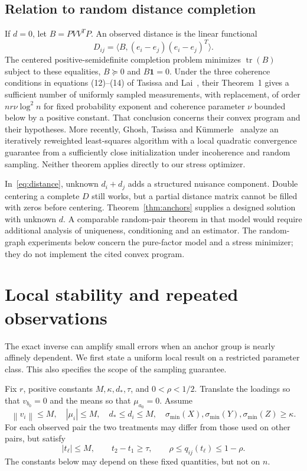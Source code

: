 \documentclass[11pt]{amsart}
\theoremstyle{definition}\newtheorem{example}[theorem]{Example}
\theoremstyle{remark}\newtheorem{remark}[theorem]{Remark}
\newcommand{\one}{\mathbf 1}\newcommand{\diag}{\operatorname{diag}}
\newcommand{\norm}[1]{\left\lVert#1\right\rVert}
\DeclareMathOperator{\tr}{tr}
\begin{document}
\subsection{Relation to random distance completion}
If $d=0$, let $B=PVV^TP$. An observed distance is the linear functional
\[
 D_{ij}=\langle B,(e_i-e_j)(e_i-e_j)^T\rangle.
\]
The centered positive-semidefinite completion problem minimizes $\tr(B)$ subject to these equalities, $B\succeq0$ and $B\one=0$. Under the three coherence conditions in equations (12)--(14) of Tasissa and Lai~\cite{tasissa2019}, their Theorem~1 gives a sufficient number of uniformly sampled measurements, with replacement, of order $nr\nu\log^2 n$ for fixed probability exponent and coherence parameter $\nu$ bounded below by a positive constant. That conclusion concerns their convex program and their hypotheses. More recently, Ghosh, Tasissa and K\"ummerle~\cite{ghosh2024} analyze an iteratively reweighted least-squares algorithm with a local quadratic convergence guarantee from a sufficiently close initialization under incoherence and random sampling. Neither theorem applies directly to our stress optimizer.

In~\eqref{eq:distance}, unknown $d_i+d_j$ adds a structured nuisance component. Double centering a complete $D$ still works, but a partial distance matrix cannot be filled with zeros before centering. Theorem~\ref{thm:anchors} supplies a designed solution with unknown $d$. A comparable random-pair theorem in that model would require additional analysis of uniqueness, conditioning and an estimator. The random-graph experiments below concern the pure-factor model and a stress minimizer; they do not implement the cited convex program.

\section{Local stability and repeated observations}\label{sec:stability}
The exact inverse can amplify small errors when an anchor group is nearly affinely dependent. We first state a uniform local result on a restricted parameter class. This also specifies the scope of the sampling guarantee.

Fix $r$, positive constants $M,\kappa,d_*,\tau$, and $0<\rho<1/2$. Translate the loadings so that $v_{b_0}=0$ and the means so that $\mu_{a_0}=0$. Assume
\begin{equation}\label{eq:compact}
 \norm{v_i}\leq M,\quad |\mu_i|\leq M,\quad d_*\leq d_i\leq M,
 \quad \sigma_{\min}(X),\sigma_{\min}(Y),\sigma_{\min}(Z)\geq\kappa.
\end{equation}
For each observed pair the two treatments may differ from those used on other pairs, but satisfy
\begin{equation}\label{eq:overlap}
 |t_\ell|\leq M,\qquad t_2-t_1\geq\tau,\qquad
 \rho\leq q_{ij}(t_\ell)\leq1-\rho.
\end{equation}
The constants below may depend on these fixed quantities, but not on $n$.
\end{document}
